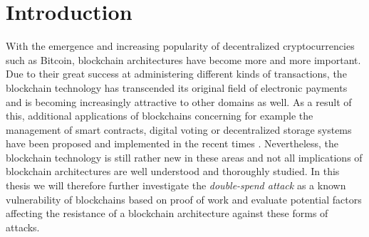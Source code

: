 \documentclass[a4paper,12pt,twoside]{report}
\begin{document}
\clearpage



\tableofcontents
\clearpage

\clearpage

\begin{acronym}
\end{acronym}



\fancyhead{}
\pagestyle{fancy}
\fancyhead[LE]{\slshape \leftmark}
\fancyhead[RO]{\slshape \rightmark}
\headheight=15pt




\chapter{Introduction}\label{intro}
With the emergence and increasing popularity of decentralized cryptocurrencies such as Bitcoin, blockchain architectures have become more and more important. Due to their great success at administering different kinds of transactions, the blockchain technology has transcended its original field of electronic payments and is becoming increasingly attractive to other domains as well. As a result of this, additional applications of blockchains concerning for example the management of smart contracts, digital voting or decentralized storage systems have been proposed and implemented in the recent times \cite{apps1,apps2}. Nevertheless, the blockchain technology is still rather new in these areas and not all implications of blockchain architectures are well understood and thoroughly studied. In this thesis we will therefore further investigate the \textit{double-spend attack} as a known vulnerability of blockchains based on proof of work and evaluate potential factors affecting the resistance of a blockchain architecture against these forms of attacks.
\end{document}
